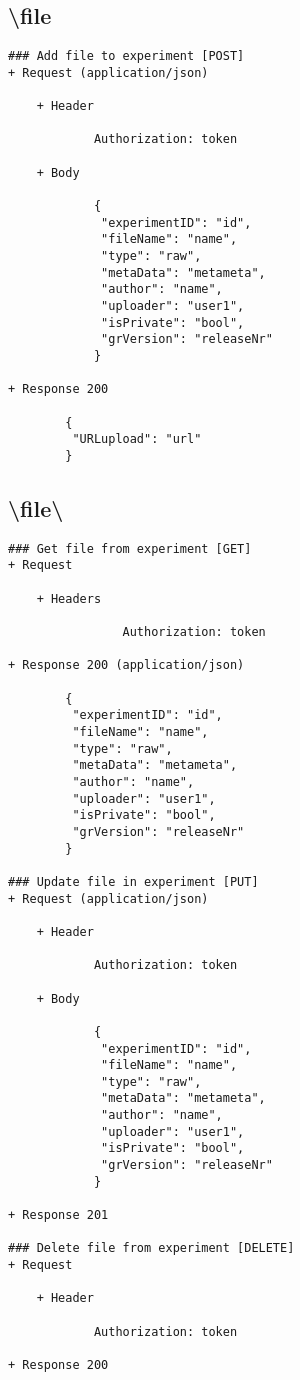 \subsection*{\textbackslash file}
\begin{verbatim}
### Add file to experiment [POST]
+ Request (application/json)

    + Header
    
            Authorization: token
    
    + Body
    
            { 
             "experimentID": "id",
             "fileName": "name",
             "type": "raw",
             "metaData": "metameta",
             "author": "name",
             "uploader": "user1",
             "isPrivate": "bool",
             "grVersion": "releaseNr"
            }

+ Response 200

        {
         "URLupload": "url"
        }

\end{verbatim}
\subsection*{\textbackslash file\textbackslash <file-id>}
\begin{verbatim}
### Get file from experiment [GET]
+ Request 

    + Headers
    
                Authorization: token
                
+ Response 200 (application/json)

        { 
         "experimentID": "id",
         "fileName": "name",
         "type": "raw",
         "metaData": "metameta",
         "author": "name",
         "uploader": "user1",
         "isPrivate": "bool",
         "grVersion": "releaseNr"
        }

### Update file in experiment [PUT]
+ Request (application/json)

    + Header
    
            Authorization: token
    
    + Body
        
            { 
             "experimentID": "id",
             "fileName": "name",
             "type": "raw",
             "metaData": "metameta",
             "author": "name",
             "uploader": "user1",
             "isPrivate": "bool",
             "grVersion": "releaseNr"
            }
            
+ Response 201

### Delete file from experiment [DELETE]
+ Request

    + Header
    
            Authorization: token
        
+ Response 200
\end{verbatim}
